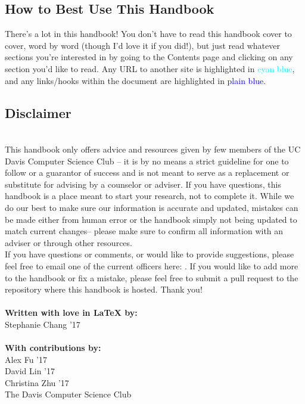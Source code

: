 \documentclass{article}
\begin{document}
\subsection{How to Best Use This Handbook}
\hspace{0.5cm}There's a lot in this handbook! You don't have to read this handbook cover to cover, word by word (though I'd love it if you did!), but just read whatever sections you're interested in by going to the Contents page and clicking on any section you'd like to read. Any URL to another site is highlighted in \textcolor{cyan}{cyan blue}, and any links/hooks within the document are highlighted in \textcolor{blue}{plain blue}. 
\subsection{Disclaimer}\\
\hspace{0.5cm}This handbook only offers advice and resources given by few members of the UC Davis Computer Science Club -- it is by no means a strict guideline for one to follow or a guarantor of success and is not meant to serve as a replacement or substitute for advising by a counselor or adviser. If you have questions, this handbook is a place meant to start your research, not to complete it. While we do our best to make sure our information is accurate and updated, mistakes can be made either from human error or the handbook simply not being updated to match current changes-- please make sure to confirm all information with an adviser or through other resources.\\

If you have questions or comments, or would like to provide suggestions, please feel free to email one of the current officers here:
. If you would like to add more to the handbook or fix a mistake, please feel free to submit a pull request to the repository where this handbook is hosted. Thank you! \\\\
\textbf{Written with love in LaTeX by:} \\
Stephanie Chang '17 \\ \\ 
\textbf{With contributions by:} \\
Alex Fu '17\\
David Lin '17\\
Christina Zhu '17\\
The Davis Computer Science Club\\
\end{document}
